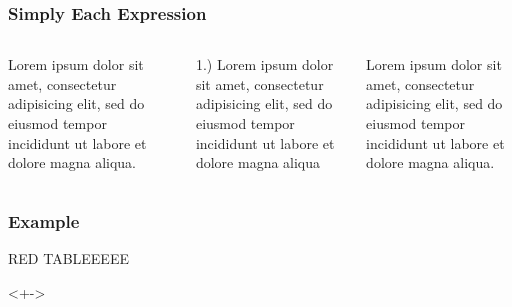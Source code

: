 \documentclass[11pt]{beamer}
\begin{document}
\begin{frame}
\frametitle{Simply Each Expression}


\begin{columns}
\begin{column}{0.25\textwidth}
Lorem ipsum dolor sit amet, consectetur adipisicing elit, sed do eiusmod tempor incididunt ut labore et dolore magna aliqua.
\end{column}
\textcolor{blue}{\vrule{}}
\begin{column}{0.375\textwidth}
1.) Lorem ipsum dolor sit amet, consectetur adipisicing elit, sed do eiusmod tempor incididunt ut labore et dolore magna aliqua
\end{column}
\vrule{}
\begin{column}{0.375\textwidth}
Lorem ipsum dolor sit amet, consectetur adipisicing elit, sed do eiusmod tempor incididunt ut labore et dolore magna aliqua.
\end{column}
\end{columns}
\end{frame}

\begin{frame}
\label{columns}
\frametitle{Example}

 
    
\end{frame}


\begin{frame}{RED TABLEEEEE}
\begin{onlyenv}<+->

\end{onlyenv}
\end{frame}
\end{document}

